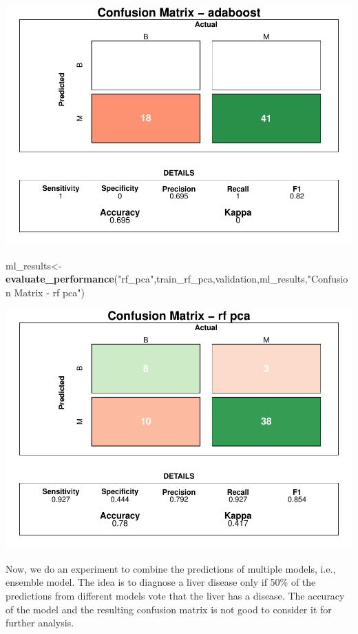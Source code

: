\documentclass[]{article}
\newenvironment{Shaded}{\begin{snugshade}}{\end{snugshade}}
\newcommand{\KeywordTok}[1]{\textcolor[rgb]{0.13,0.29,0.53}{\textbf{#1}}}
\newcommand{\NormalTok}[1]{#1}
\newcommand{\StringTok}[1]{\textcolor[rgb]{0.31,0.60,0.02}{#1}}
\begin{document}
\includegraphics{LiverDisease_files/figure-latex/unnamed-chunk-47-1.pdf}

\begin{Shaded}
\begin{Highlighting}[]
\NormalTok{ml_results<-}\KeywordTok{evaluate_performance}\NormalTok{(}\StringTok{"rf_pca"}\NormalTok{,train_rf_pca,validation,ml_results,}\StringTok{"Confusion Matrix - rf pca"}\NormalTok{)}
\end{Highlighting}
\end{Shaded}

\includegraphics{LiverDisease_files/figure-latex/unnamed-chunk-48-1.pdf}

Now, we do an experiment to combine the predictions of multiple models,
i.e., ensemble model. The idea is to diagnose a liver disease only if
50\% of the predictions from different models vote that the liver has a
disease. The accuracy of the model and the resulting confusion matrix is
not good to consider it for further analysis.
\end{document}
